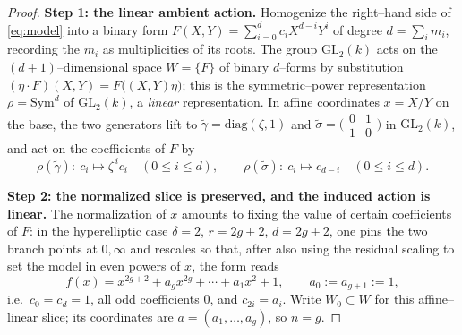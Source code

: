 \documentclass{amsart}
\theoremstyle{definition}
\begin{document}
\begin{proof}
\textbf{Step 1: the linear ambient action.}
Homogenize the right--hand side of \eqref{eq:model} into a binary form
$F(X,Y)=\sum_{i=0}^{d} c_i X^{d-i}Y^{i}$ of degree $d=\sum_i m_i$, recording the
$m_i$ as multiplicities of its roots. The group $\mathrm{GL}_2(k)$ acts on the
$(d{+}1)$--dimensional space $W=\{F\}$ of binary $d$--forms by substitution
$(\eta\cdot F)(X,Y)=F\bigl((X,Y)\eta\bigr)$; this is the symmetric--power
representation $\rho=\mathrm{Sym}^{d}$ of $\mathrm{GL}_2(k)$, a \emph{linear}
representation. In affine coordinates $x=X/Y$ on the base, the two generators lift
to $\widetilde\gamma=\mathrm{diag}(\zeta,1)$ and
$\widetilde\sigma=\bigl(\begin{smallmatrix}0&1\\1&0\end{smallmatrix}\bigr)$ in
$\mathrm{GL}_2(k)$, and act on the coefficients of $F$ by
\begin{equation}\label{eq:rho-action}
 \rho(\widetilde\gamma):\ c_i\mapsto \zeta^{\,i}c_i\quad(0\le i\le d),
 \qquad
 \rho(\widetilde\sigma):\ c_i\mapsto c_{d-i}\quad(0\le i\le d).
\end{equation}

\textbf{Step 2: the normalized slice is preserved, and the induced action is
linear.}
The normalization of $x$ amounts to fixing the value of certain coefficients of
$F$: in the hyperelliptic case $\delta=2$, $r=2g+2$, $d=2g+2$, one pins the two
branch points at $0,\infty$ and rescales so that, after also using the residual
scaling to set the model in even powers of $x$, the form reads
\begin{equation}\label{eq:hypform}
 f(x)=x^{2g+2}+a_g x^{2g}+\cdots+a_1 x^2+1,\qquad a_0:=a_{g+1}:=1,
\end{equation}
i.e.\ $c_0=c_{d}=1$, all odd coefficients $0$, and $c_{2i}=a_i$. Write
$W_0\subset W$ for this affine--linear slice; its coordinates are $a=(a_1,\dots,
a_g)$, so $n=g$.


\end{proof}
\end{document}
